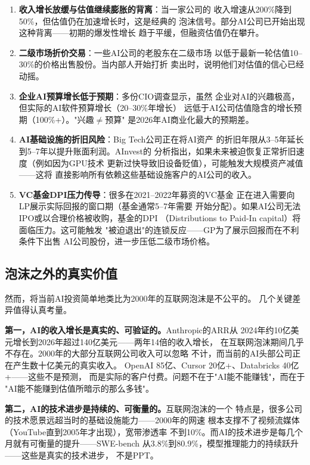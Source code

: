 \begin{warnbox}[估值泡沫的五个预警信号]
\begin{enumerate}
  \item \textbf{收入增长放缓与估值继续膨胀的背离}：当一家公司的
    收入增速从200\%降到50\%，但估值仍在加速增长时，这是经典的
    泡沫信号。部分AI公司已开始出现这种背离——初期的爆发性增长
    趋于平缓，但融资估值仍在攀升。
  \item \textbf{二级市场折价交易}：一些AI公司的老股东在二级市场
    以低于最新一轮估值10--30\%的价格出售股份。当内部人开始打折
    卖出时，说明他们对估值的信心已经动摇。
  \item \textbf{企业AI预算增长低于预期}：多份CIO调查显示，虽然
    企业对AI的兴趣极高，但实际的AI软件预算增长（20--30\%年增长）
    远低于AI公司估值隐含的增长预期（100\%+）。"兴趣$\neq$预算"
    是2026年AI商业化最大的预期差。
  \item \textbf{AI基础设施的折旧风险}：Big Tech公司正在将AI资产
    的折旧年限从3--5年延长到5--7年以提升账面利润。AInvest的
    分析指出，如果未来被迫恢复正常折旧速度（例如因为GPU技术
    更新过快导致旧设备贬值），可能触发大规模资产减值——这将
    直接影响所有依赖这些基础设施客户的AI公司的收入。
  \item \textbf{VC基金DPI压力传导}：很多在2021--2022年募资的VC基金
    正在进入需要向LP展示实际回报的窗口期（基金通常5--7年需要
    开始分配）。如果AI公司无法IPO或以合理价格被收购，基金的DPI
    （Distributions to Paid-In capital）将面临压力。这可能触发
    "被迫退出"的连锁反应——GP为了展示回报而在不利条件下出售
    AI公司股份，进一步压低二级市场价格。
\end{enumerate}
\end{warnbox}

\subsection{泡沫之外的真实价值}
\label{subsec:fund-real-value}

然而，将当前AI投资简单地类比为2000年的互联网泡沫是不公平的。
几个关键差异值得认真考量。

\textbf{第一，AI的收入增长是真实的、可验证的。}Anthropic的ARR从
2024年约10亿美元增长到2026年超过140亿美元——两年14倍的收入增长，
在互联网泡沫期间几乎不存在。2000年的大部分互联网公司收入可以忽略
不计，而当前的AI头部公司正在产生数十亿美元的真实收入。
OpenAI 85亿、Cursor 20亿+、Databricks 40亿+——这些不是预测，
而是实际的客户付费。问题不在于"AI能不能赚钱"，而在于
"AI能不能赚到估值所暗示的那么多钱"。

\textbf{第二，AI的技术进步是持续的、可衡量的。}互联网泡沫的一个
特点是，很多公司的技术愿景远超当时的基础设施能力——2000年的网速
根本支撑不了视频流媒体（YouTube直到2005年才出现），宽带渗透率
不到10\%。而AI的技术进步是每几个月就有可衡量的提升——SWE-bench
从3.8\%到80.9\%，模型推理能力的持续跃升——这些是真实的技术进步，
不是PPT。

